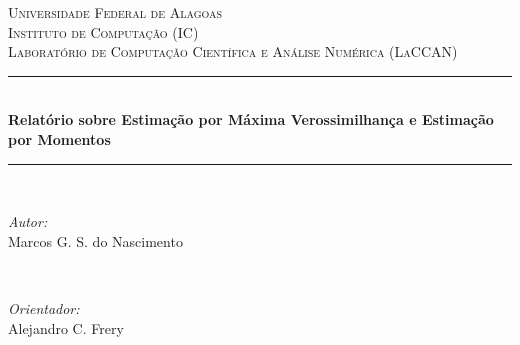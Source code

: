 \begin{titlepage}

\newcommand{\HRule}{\rule{\linewidth}{0.5mm}} %

\center %
 

\textsc{\LARGE Universidade Federal de Alagoas}\\[1.5cm] %
\textsc{\Large Instituto de Computação (IC)}\\[0.5cm] %
\textsc{\large Laboratório de Computação Científica e Análise Numérica (LaCCAN)}\\[0.5cm] %


\HRule \\[0.4cm]
{ \LARGE \bfseries Relatório sobre Estimação por Máxima Verossimilhança e Estimação por Momentos}\\[0.4cm] %
\HRule \\[1.5cm]
 

\begin{minipage}{0.4\textwidth}
\begin{flushleft} \large
\emph{Autor:}\\
Marcos G. S. do Nascimento %
\end{flushleft}
\end{minipage}
~
\begin{minipage}{0.4\textwidth}
\begin{flushright} \large
\emph{Orientador:} \\
Alejandro C. Frery  %
\end{flushright}
\end{minipage}\\[2cm]


\end{titlepage}
